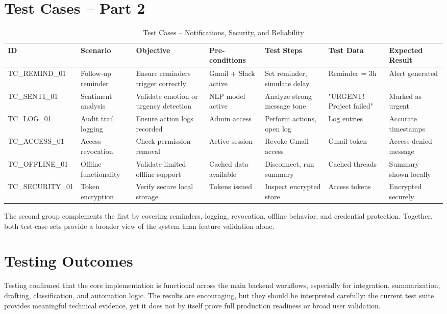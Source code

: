\section{Test Cases -- Part 2}
\begin{table}[!htbp]
\centering
\footnotesize
\renewcommand{\arraystretch}{1.15}
\setlength{\tabcolsep}{5pt}
\begin{adjustbox}{max width=\textwidth}
\begin{tabularx}{\textwidth}{|l|Y|Y|Y|Y|Y|Y|}
\hline
\textbf{ID} & \textbf{Scenario} & \textbf{Objective} & \textbf{Pre-conditions} & \textbf{Test Steps} & \textbf{Test Data} & \textbf{Expected Result} \\ \hline
TC\_REMIND\_01 & Follow-up reminder & Ensure reminders trigger correctly & Gmail + Slack active & Set reminder, simulate delay & Reminder = 3h & Alert generated \\ \hline
TC\_SENTI\_01 & Sentiment analysis & Validate emotion or urgency detection & NLP model active & Analyze strong message tone & "URGENT! Project failed" & Marked as urgent \\ \hline
TC\_LOG\_01 & Audit trail logging & Ensure action logs recorded & Admin access & Perform actions, open log & Log entries & Accurate timestamps \\ \hline
TC\_ACCESS\_01 & Access revocation & Check permission removal & Active session & Revoke Gmail access & Gmail token & Access denied message \\ \hline
TC\_OFFLINE\_01 & Offline functionality & Validate limited offline support & Cached data available & Disconnect, run summary & Cached threads & Summary shown locally \\ \hline
TC\_SECURITY\_01 & Token encryption & Verify secure local storage & Tokens issued & Inspect encrypted store & Access tokens & Encrypted securely \\ \hline
\end{tabularx}
\end{adjustbox}
\caption{Test Cases – Notifications, Security, and Reliability}
\end{table}
\FloatBarrier

The second group complements the first by covering reminders, logging, revocation, offline behavior, and credential protection. Together, both test-case sets provide a broader view of the system than feature validation alone.

\section{Testing Outcomes}
Testing confirmed that the core implementation is functional across the main backend workflows, especially for integration, summarization, drafting, classification, and automation logic. The results are encouraging, but they should be interpreted carefully: the current test suite provides meaningful technical evidence, yet it does not by itself prove full production readiness or broad user validation.

